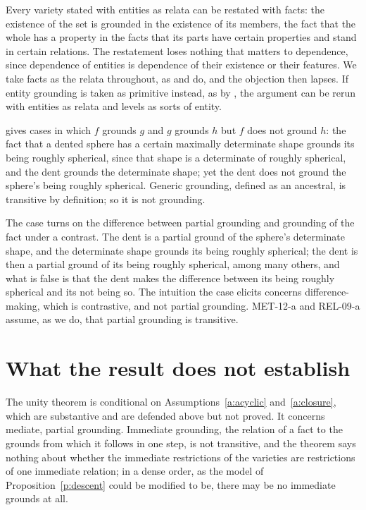 \documentclass{situationist-preprint}
\begin{document}
\begin{reply}
Every variety stated with entities as relata can be restated with facts: the existence of the set is grounded in the existence of its members, the fact that the whole has a property in the facts that its parts have certain properties and stand in certain relations. The restatement loses nothing that matters to dependence, since dependence of entities is dependence of their existence or their features. We take facts as the relata throughout, as \citet{Rosen2010} and \citet{Audi2012} do, and the objection then lapses. If entity grounding is taken as primitive instead, as by \citet{Schaffer2009}, the argument can be rerun with entities as relata and levels as sorts of entity.
\end{reply}

\begin{objection}\label{o:trans}
\citet{Schaffer2012} gives cases in which $f$ grounds $g$ and $g$ grounds $h$ but $f$ does not ground $h$: the fact that a dented sphere has a certain maximally determinate shape grounds its being roughly spherical, since that shape is a determinate of roughly spherical, and the dent grounds the determinate shape; yet the dent does not ground the sphere's being roughly spherical. Generic grounding, defined as an ancestral, is transitive by definition; so it is not grounding.
\end{objection}

\begin{reply}
The case turns on the difference between partial grounding and grounding of the fact under a contrast. The dent is a partial ground of the sphere's determinate shape, and the determinate shape grounds its being roughly spherical; the dent is then a partial ground of its being roughly spherical, among many others, and what is false is that the dent makes the difference between its being roughly spherical and its not being so. The intuition the case elicits concerns difference-making, which is contrastive, and not partial grounding. MET-12-a and REL-09-a assume, as we do, that partial grounding is transitive.
\end{reply}

\section{What the result does not establish}\label{s:limits}

The unity theorem is conditional on Assumptions~\ref{a:acyclic} and~\ref{a:closure}, which are substantive and are defended above but not proved. It concerns mediate, partial grounding. Immediate grounding, the relation of a fact to the grounds from which it follows in one step, is not transitive, and the theorem says nothing about whether the immediate restrictions of the varieties are restrictions of one immediate relation; in a dense order, as the model of Proposition~\ref{p:descent} could be modified to be, there may be no immediate grounds at all.
\end{document}
